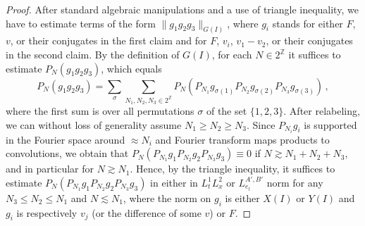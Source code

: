\documentclass[aihp]{imsart}
\numberwithin{equation}{section}
\theoremstyle{plain}
\theoremstyle{remark}
\newcommand{\Z}{\mathbb{Z}}
\begin{document}
\begin{proof}
After standard algebraic manipulations and a use of triangle inequality, we have to estimate terms of the form $\|g_1 g_2g_3\|_{G(I)}$, where $g_i$ stands for either $F$, $v$, or their conjugates
in the first claim and for $F$, $v_i$, $v_1 - v_2$, or their conjugates in the second claim. By the definition of $G(I)$, for each $N \in 2^\Z$ it suffices  to estimate $P_N(g_1 g_2g_3)$, which equals
$$
P_N(g_1 g_2g_3) = \sum_{\sigma} \sum_{N_1, N_2, N_3 \in 2^\Z} P_N(P_{N_1}g_{\sigma(1)} P_{N_2}g_{\sigma(2)} P_{N_3} g_{\sigma(3)})  \,,
$$
where the first sum is over all permutations $\sigma$ of the set $\{1, 2, 3\}$.
After relabeling, we can without loss of generality assume $N_1 \geq N_2 \geq N_3$. Since $P_{N_i} g_i$ is supported in the Fourier space around $\approx N_i$ and Fourier transform 
maps products to convolutions, we obtain that $P_N(P_{N_1}g_1 P_{N_2}g_2 P_{N_3} g_3) \equiv 0$ if $N \gtrsim N_1+ N_2 + N_3$, and in particular for $N \gtrsim N_1$. 
Hence, by the triangle inequality, it suffices to estimate  $P_N(P_{N_1}g_1 P_{N_2}g_2 P_{N_3} g_3)$ in either in $L^1_tL^2_x$ or $L^{A', B'}_{e_l}$ norm for any $N_3 \leq N_2 \leq N_1$ and $N \lesssim N_1$, 
where the norm on $g_i$ is either $X(I)$ or $Y(I)$ and $g_i$ is respectively $v_j$ (or the difference of some $v$) or $F$.


\end{proof}
\end{document}
